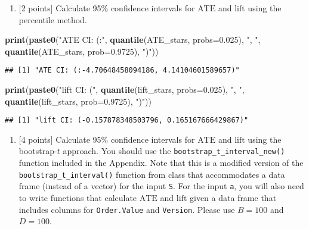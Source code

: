 \documentclass[
]{article}
\newenvironment{Shaded}{\begin{snugshade}}{\end{snugshade}}
\newcommand{\AttributeTok}[1]{\textcolor[rgb]{0.13,0.29,0.53}{#1}}
\newcommand{\FloatTok}[1]{\textcolor[rgb]{0.00,0.00,0.81}{#1}}
\newcommand{\FunctionTok}[1]{\textcolor[rgb]{0.13,0.29,0.53}{\textbf{#1}}}
\newcommand{\NormalTok}[1]{#1}
\newcommand{\StringTok}[1]{\textcolor[rgb]{0.31,0.60,0.02}{#1}}
\providecommand{\tightlist}{%
  \setlength{\itemsep}{0pt}\setlength{\parskip}{0pt}}
\begin{document}
\begin{enumerate}
\def\labelenumi{(\alph{enumi})}
\setcounter{enumi}{5}
\tightlist
\item
  {[}2 points{]} Calculate 95\% confidence intervals for \(\text{ATE}\)
  and \(\text{lift}\) using the percentile method.
\end{enumerate}

\begin{Shaded}
\begin{Highlighting}[]
\FunctionTok{print}\NormalTok{(}\FunctionTok{paste0}\NormalTok{(}\StringTok{"ATE CI: (:"}\NormalTok{, }\FunctionTok{quantile}\NormalTok{(ATE\_stars, }\AttributeTok{probs=}\FloatTok{0.025}\NormalTok{), }\StringTok{", "}\NormalTok{, }\FunctionTok{quantile}\NormalTok{(ATE\_stars, }\AttributeTok{prob=}\FloatTok{0.9725}\NormalTok{), }\StringTok{")"}\NormalTok{))}
\end{Highlighting}
\end{Shaded}

\begin{verbatim}
## [1] "ATE CI: (:-4.70648458094186, 4.14104601589657)"
\end{verbatim}

\begin{Shaded}
\begin{Highlighting}[]
\FunctionTok{print}\NormalTok{(}\FunctionTok{paste0}\NormalTok{(}\StringTok{"lift CI: ("}\NormalTok{, }\FunctionTok{quantile}\NormalTok{(lift\_stars, }\AttributeTok{probs=}\FloatTok{0.025}\NormalTok{), }\StringTok{", "}\NormalTok{, }\FunctionTok{quantile}\NormalTok{(lift\_stars, }\AttributeTok{prob=}\FloatTok{0.9725}\NormalTok{), }\StringTok{")"}\NormalTok{))}
\end{Highlighting}
\end{Shaded}

\begin{verbatim}
## [1] "lift CI: (-0.157878348503796, 0.165167666429867)"
\end{verbatim}

\begin{enumerate}
\def\labelenumi{(\alph{enumi})}
\setcounter{enumi}{6}
\tightlist
\item
  {[}4 points{]} Calculate 95\% confidence intervals for \(\text{ATE}\)
  and \(\text{lift}\) using the bootstrap-\(t\) approach. You should use
  the \texttt{bootstrap\_t\_interval\_new()} function included in the
  Appendix. Note that this is a modified version of the
  \texttt{bootstrap\_t\_interval()} function from class that
  accommodates a data frame (instead of a vector) for the input
  \texttt{S}. For the input \texttt{a}, you will also need to write
  functions that calculate \(\text{ATE}\) and \(\text{lift}\) given a
  data frame that includes columns for \texttt{Order.Value} and
  \texttt{Version}. Please use \(B=100\) and \(D=100\).
\end{enumerate}
\end{document}
